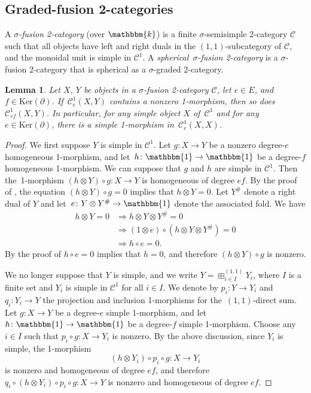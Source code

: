 \documentclass[a4paper, oneside]{amsart}
\numberwithin{equation}{subsection}
\theoremstyle{referencedlemma}
\theoremstyle{plain} %
\newtheorem{lem}[equation]{Lemma}
\theoremstyle{remark}
\begin{document}
\subsection{Graded-fusion 2-categories}\label{Definition_Graded-fusion 2-categories}

A \emph{$\sigma$-fusion 2-category} (over $\mathbbm{k}$) is a finite $\sigma$-semisimple 2-category $\mathcal{C}$ such that all objects have left and right duals in the $(1,1)$-subcategory of $\mathcal{C}$, and the monoidal unit is simple in $\mathcal{C}^1$.  A \emph{spherical~$\sigma$-fusion 2-category} is a $\sigma$-fusion 2-category that is spherical as a $\sigma$-graded 2-category.

\begin{lem}\label{nonzero_Hom_categories} Let  $X$, $Y$ be objects in a $\sigma$-fusion 2-category $\mathcal{C}$,  let $e\in E$,  and $f\in \mathrm{Ker}(\partial)$. If~$\mathcal{C}^1_e(X,Y)$ contains a nonzero 1-morphism, then so does $\mathcal{C}^1_{ef}(X,Y)$.  In particular, for any simple object $X$ of~$\mathcal{C}^1$ and for any~\mbox{$e\in \mathrm{Ker}(\partial)$,} there is a simple 1-morphism in~$\mathcal{C}^1_e(X,X)$.
\end{lem}

\begin{proof}
We first suppose $Y$ is simple in $\mathcal{C}^1$.  Let $g\colon X\to Y$ be a nonzero degree-$e$ homogeneous 1-morphism, and let~$h\colon \mathbbm{1}\to \mathbbm{1}$ be a degree-$f$ homogeneous 1-morphism.  We can suppose that $g$ and $h$ are simple in $\mathcal{C}^1$. Then the~1-morphism $(h\otimes Y) \circ g \colon X\to Y$ is homogeneous of degree $ef$.  By the proof of \cite[Proposition~1.2.19]{douglas_fusion_2018}, the equation $(h\otimes Y) \circ g = 0$ implies that $h\otimes Y = 0$.  Let $Y^\#$ denote a right dual of $Y$ and let~$e \colon Y \otimes Y^\# \to \mathbbm{1}$ denote the associated fold.  We have
\begin{align*}
h\otimes Y = 0 & \Rightarrow h \otimes Y \otimes Y^\# = 0\\
& \Rightarrow (1 \otimes e) \circ (h\otimes Y \otimes Y^\#) = 0\\
& \Rightarrow h\circ e = 0.
\end{align*}
By the proof of \cite[Proposition 1.2.19]{douglas_fusion_2018} $h\circ e = 0$ implies that $h = 0$,  and therefore $(h\otimes Y) \circ g$ is nonzero. 

We no longer suppose that $Y$ is simple, and we write $Y =\boxplus^{(1,1)}_{i\in I} Y_i $, where $I$ is a finite set and $Y_i$ is simple in $\mathcal{C}^1$ for all $i\in I$.  We denote by $p_i \colon Y\to Y_i$ and $q_i\colon Y_i \to Y$ the projection and inclusion 1-morphisms for the~$(1,1)$-direct sum.  Let $g\colon X\to Y$ be a degree-$e$ simple 1-morphism, and let~$h\colon \mathbbm{1}\to \mathbbm{1}$ be a degree-$f$ simple 1-morphism. Choose any~$i\in I$ such that $p_i \circ g \colon X \to Y_i$ is nonzero.  By the above discussion, since $Y_i$ is simple,  the 1-morphism
$$
(h\otimes Y_i) \circ p_i \circ g\colon X \to Y_i
$$ 
is nonzero and homogeneous of degree $ef$, and therefore $q_i \circ (h\otimes Y_i) \circ p_i \circ g\colon X \to Y$ is nonzero and homogeneous of degree $ef$. 
\end{proof}
\end{document}
